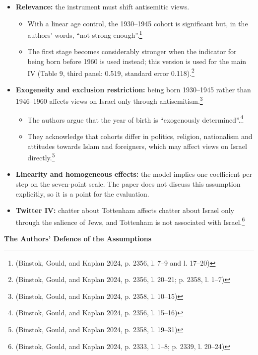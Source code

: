 \begin{itemize}
\item
  \textbf{Relevance:} the instrument must shift antisemitic views.

  \begin{itemize}
  \item
    With a linear age control, the 1930--1945 cohort is significant but, in the authors' words, ``not strong enough''.\footnote{(Binstok, Gould, and Kaplan 2024, p. 2356, l. 7--9 and l. 17--20)}
  \item
    The first stage becomes considerably stronger when the indicator for being born before 1960 is used instead; this version is used for the main IV (Table 9, third panel: 0.519, standard error 0.118).\footnote{(Binstok, Gould, and Kaplan 2024, p. 2356, l. 20--21; p. 2358, l. 1--7)}
  \end{itemize}
\item
  \textbf{Exogeneity and exclusion restriction:} being born 1930--1945 rather than 1946--1960 affects views on Israel only through antisemitism.\footnote{(Binstok, Gould, and Kaplan 2024, p. 2358, l. 10--15)}

  \begin{itemize}
  \item
    The authors argue that the year of birth is ``exogenously determined''.\footnote{(Binstok, Gould, and Kaplan 2024, p. 2356, l. 15--16)}
  \item
    They acknowledge that cohorts differ in politics, religion, nationalism and attitudes towards Islam and foreigners, which may affect views on Israel directly.\footnote{(Binstok, Gould, and Kaplan 2024, p. 2358, l. 19--31)}
  \end{itemize}
\item
  \textbf{Linearity and homogeneous effects:} the model implies one coefficient per step on the seven-point scale. The paper does not discuss this assumption explicitly, so it is a point for the evaluation.
\item
  \textbf{Twitter IV:} chatter about Tottenham affects chatter about Israel only through the salience of Jews, and Tottenham is not associated with Israel.\footnote{(Binstok, Gould, and Kaplan 2024, p. 2333, l. 1--8; p. 2339, l. 20--24)}
\end{itemize}

\par\textbf{The Authors' Defence of the Assumptions}\par

